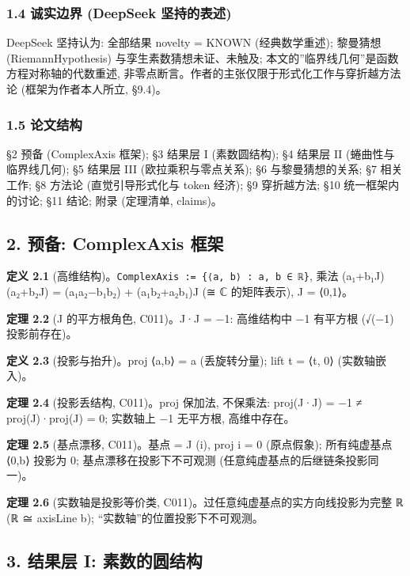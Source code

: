 \documentclass[
]{article}
\begin{document}
\subsubsection{1.4 诚实边界 (DeepSeek
坚持的表述)}\label{ux8bdaux5b9eux8fb9ux754c-deepseek-ux575aux6301ux7684ux8868ux8ff0}

DeepSeek 坚持认为: 全部结果 novelty = KNOWN (经典数学重述); 黎曼猜想
(RiemannHypothesis) 与孪生素数猜想未证、未触及;
本文的''临界线几何''是函数方程对称轴的代数重述,
非零点断言。作者的主张仅限于形式化工作与穿折越方法论
(框架为作者本人所立, §9.4)。

\subsubsection{1.5 论文结构}\label{ux8bbaux6587ux7ed3ux6784}

§2 预备 (ComplexAxis 框架); §3 结果层 I (素数圆结构); §4 结果层 II
(蜷曲性与临界线几何); §5 结果层 III (欧拉乘积与零点关系); §6
与黎曼猜想的关系; §7 相关工作; §8 方法论 (直觉引导形式化与 token 经济);
§9 穿折越方法; §10 统一框架内的讨论; §11 结论; 附录 (定理清单, claims)。

\subsection{2. 预备: ComplexAxis
框架}\label{ux9884ux5907-complexaxis-ux6846ux67b6}

\textbf{定义 2.1}
(高维结构)。\texttt{ComplexAxis\ :=\ \{⟨a,\ b⟩\ :\ a,\ b\ ∈\ ℝ\}}, 乘法
(a₁+b₁J)(a₂+b₂J) = (a₁a₂−b₁b₂) + (a₁b₂+a₂b₁)J (≅ ℂ 的矩阵表示), J =
⟨0,1⟩。

\textbf{定理 2.2} (J 的平方根角色, C011)。J·J = −1: 高维结构中 −1
有平方根 (√(−1) 投影前存在)。

\textbf{定义 2.3} (投影与抬升)。proj ⟨a,b⟩ = a (丢旋转分量); lift t =
⟨t, 0⟩ (实数轴嵌入)。

\textbf{定理 2.4} (投影丢结构, C011)。proj 保加法, 不保乘法: proj(J·J) =
−1 ≠ proj(J)·proj(J) = 0; 实数轴上 −1 无平方根, 高维中存在。

\textbf{定理 2.5} (基点漂移, C011)。基点 = J (i), proj i = 0 (原点假象);
所有纯虚基点 ⟨0,b⟩ 投影为 0; 基点漂移在投影下不可观测
(任意纯虚基点的后继链条投影同一)。

\textbf{定理 2.6} (实数轴是投影等价类,
C011)。过任意纯虚基点的实方向线投影为完整 ℝ (ℝ ≅ axisLine b);
``实数轴''的位置投影下不可观测。

\subsection{3. 结果层 I:
素数的圆结构}\label{ux7ed3ux679cux5c42-i-ux7d20ux6570ux7684ux5706ux7ed3ux6784}
\end{document}
